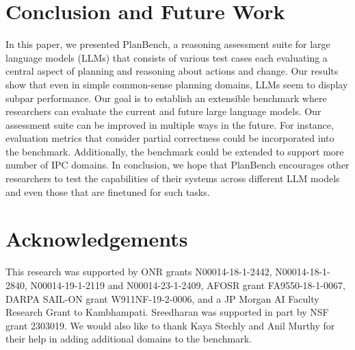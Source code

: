 \section{Conclusion and Future Work}
In this paper, we presented PlanBench, a reasoning assessment suite for large language models (LLMs) that consists of various test cases each evaluating a central aspect of planning and reasoning about actions and change. Our results show that even in simple common-sense planning domains, LLMs seem to display subpar performance. Our goal is to establish an extensible benchmark where researchers can evaluate the current and future large language models. Our assessment suite can be improved in multiple ways in the future. For instance, evaluation metrics that consider partial correctness could be incorporated into the benchmark. Additionally, the benchmark could be extended to support more number of IPC domains.
In conclusion, we hope that PlanBench
encourages other researchers to test the capabilities of their systems across different LLM models \cite{chowdhery2022palm, du2021glam, smith2022using, zhang2022opt, rae2021scaling, thoppilan2022lamda, hoffmann2022training} and even those that are finetuned for such tasks.\section{Acknowledgements}
This research was supported  by ONR grants N00014-18-1-2442,
N00014-18-1-2840, N00014-19-1-2119 and N00014-23-1-2409, AFOSR grant
FA9550-18-1-0067, DARPA SAIL-ON grant W911NF-19-2-0006, and a JP Morgan
AI Faculty Research Grant to Kambhampati. Sreedharan was supported in
part by NSF grant 2303019. We would also like to thank Kaya Stechly and Anil Murthy for their help in adding additional domains to the benchmark.

